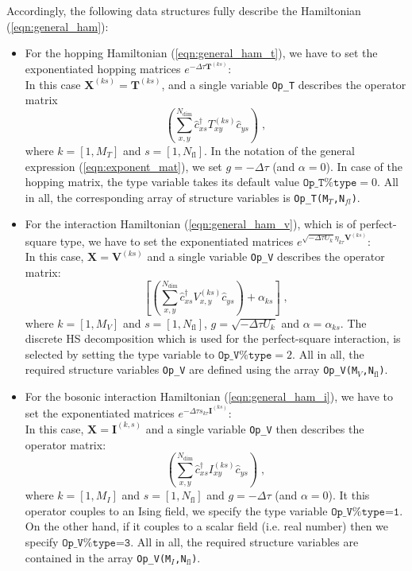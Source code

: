 Accordingly, the following data structures fully describe the  Hamiltonian (\ref{eqn:general_ham}):
\begin{itemize}
\item For the hopping Hamiltonian (\ref{eqn:general_ham_t}), we have to set the exponentiated hopping matrices $ e^{-\Delta \tau {\bm T}^{(ks)}}$: \\
In this case $\bm{X}^{(ks)}=\bm{T}^{(ks)}$, and a single variable  \texttt{Op\_T}  describes the operator matrix
\begin{equation}
            \left( \sum_{x,y}^{N_{\mathrm{dim}}} \hat{c}^{\dagger}_{xs} T_{xy}^{(ks)} \hat{c}^{\phantom{\dagger}}_{ys}  \right)  \;,
\end{equation} 
where $k=[1, M_{T}]$ and $s=[1, N_{\mathrm{fl}}]$. In the notation of the general expression (\ref{eqn:exponent_mat}), we set $g=-\Delta \tau$ (and $\alpha = 0$).
In case of the hopping matrix, the type variable  takes its default value  $\texttt{Op\_T\%type}=0$. 
All in all, the corresponding array of structure variables is  \texttt{Op\_T(M$_T$,N$_{fl}$)}.

\item For the interaction Hamiltonian (\ref{eqn:general_ham_v}), which is of perfect-square type, we have to set the exponentiated matrices $e^{  \sqrt{ -  \Delta \tau  U_k} \eta_{k\tau} {\bm V}^{(ks)} }$:\\
In this case, $\bm{X}  = \bm{V}^{(ks)}$ and a single variable  \texttt{Op\_V}  describes the operator matrix:
\begin{equation}
             \left[ \left( \sum_{x,y}^{N_{\mathrm{dim}}} \hat{c}^{\dagger}_{xs} V_{x,y}^{(ks)} \hat{c}^{\phantom{\dagger}}_{ys}  \right)  + \alpha_{ks} \right]  \;,
\end{equation} 
where $k=[1, M_{V}]$ and $s=[1, N_{\mathrm{fl}}]$, $g = \sqrt{-\Delta \tau  U_k}$ and  $\alpha = \alpha_{ks}$. 
The discrete HS decomposition which is used for the perfect-square interaction, is selected by setting the type variable to $\texttt{Op\_V\%type}=2$.
All in all, the required structure variables \texttt{Op\_V} are defined  using the array \texttt{Op\_V(M$_V$,N$_\mathrm{fl}$)}.

\item For the bosonic interaction Hamiltonian (\ref{eqn:general_ham_i}), we have to set the exponentiated matrices $e^{  -\Delta \tau s_{k\tau}  {\bm I}^{(ks)}}$:\\
In this case, $\bm{X}  = \bm{I}^{(k,s)} $ and a single variable  \texttt{Op\_V} then  describes the operator matrix:
\begin{equation}
            \left( \sum_{x,y}^{N_{\mathrm{dim}}} \hat{c}^{\dagger}_{xs} I_{xy}^{(ks)} \hat{c}^{\phantom{\dagger}}_{ys}  \right)  \;,
\end{equation} 
where $k=[1, M_{I}]$ and $s=[1, N_{\mathrm{fl}}]$ and $g = -\Delta \tau$ (and $\alpha = 0$).
It this operator couples to an Ising field, we specify the  type variable  $\texttt{Op\_V\%type=1}$.    On the other hand, if it couples to a scalar field (i.e. real number)   then we 
specify $\texttt{Op\_V\%type=3}$.
All in all, the required structure variables are contained in the array \texttt{Op\_V(M$_{I}$,N$_\mathrm{fl}$)}.


\end{itemize}
